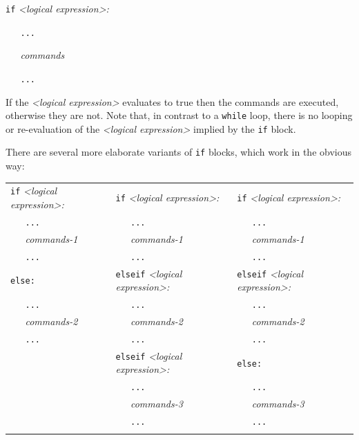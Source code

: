 \noindent
\texttt{if} \textit{<logical expression>:}

\noindent
\texttt{\ \ \ ...}

\noindent
\textit{\ \ \ commands}

\noindent
\texttt{\ \ \ ...}





\vspace{3mm}

\noindent
If the \textit{<logical expression>} evaluates to true
then the commands are executed, otherwise they are not. Note that,
in contrast to a \texttt{while} loop, there is no looping or re-evaluation
of the \textit{<logical expression>} implied by the \texttt{if} block.

There are several more elaborate variants of \texttt{if} blocks, which work
in the obvious way:

\vspace{2mm}

\begin{tabular}{p{4.3cm}p{4.7cm}p{4.5cm}}
\texttt{if} \textit{<logical expression>:} & \texttt{if} \textit{<logical expression>:} &
\texttt{if} \textit{<logical expression>:} \\
\texttt{\ \ \ ...} & \texttt{\ \ \ ...} & \texttt{\ \ \ ...} \\
\textit{\ \ \ commands-1} & \textit{\ \ \ commands-1} & \textit{\ \ \ commands-1} \\
\texttt{\ \ \ ...} & \texttt{\ \ \ ...} & \texttt{\ \ \ ...} \\
\texttt{else:} & \texttt{elseif} \textit{<logical expression>:} &
\texttt{elseif} \textit{<logical expression>:} \\
\texttt{\ \ \ ...} & \texttt{\ \ \ ...} & \texttt{\ \ \ ...} \\
\textit{\ \ \ commands-2} & \textit{\ \ \ commands-2} & \textit{\ \ \ commands-2} \\
\texttt{\ \ \ ...} & \texttt{\ \ \ ...} & \texttt{\ \ \ ...} \\
& \texttt{elseif} \textit{<logical expression>:} & \texttt{else:} \\
             & \texttt{\ \ \ ...} & \texttt{\ \ \ ...} \\
             & \textit{\ \ \ commands-3} & \textit{\ \ \ commands-3} \\
             & \texttt{\ \ \ ...} & \texttt{\ \ \ ...} \\
             & & 
\end{tabular}

